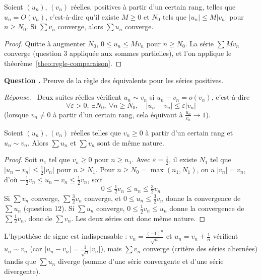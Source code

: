 \documentclass[11pt]{article}
\newcounter{qnum}
\newcommand{\question}[1]{%
\stepcounter{qnum}%
\bigskip
\noindent\textbf{Question \theqnum.} #1\par}
\newcommand{\reponse}{\noindent\textit{Réponse.}\ }
\begin{document}
\begin{coro}[Domination]
\label{coro:domination}
Soient $(u_n)$, $(v_n)$ réelles, positives à partir d'un certain rang, telles que $u_n=O(v_n)$, c'est-à-dire qu'il existe $M\geq 0$ et $N_0$ tels que $|u_n|\leq M|v_n|$ pour $n\geq N_0$. Si $\sum v_n$ converge, alors $\sum u_n$ converge.
\end{coro}

\begin{proof}
Quitte à augmenter $N_0$, $0\leq u_n\leq Mv_n$ pour $n\geq N_0$. La série $\sum Mv_n$ converge (question 3 appliquée aux sommes partielles), et l'on applique le théorème~\ref{theo:regle-comparaison}.
\end{proof}

\question{Preuve de la règle des équivalents pour les séries positives.}
\reponse
Deux suites réelles vérifient $u_n\sim v_n$ si $u_n-v_n=o(v_n)$, c'est-à-dire
\[\forall\varepsilon>0,\ \exists N_0,\ \forall n\geq N_0,\quad|u_n-v_n|\leq\varepsilon|v_n|\]
(lorsque $v_n\neq 0$ à partir d'un certain rang, cela équivaut à $\frac{u_n}{v_n}\to 1$).

\begin{theo}
\label{theo:regle-equivalents}
Soient $(u_n)$, $(v_n)$ réelles telles que $v_n\geq 0$ à partir d'un certain rang et $u_n\sim v_n$. Alors $\sum u_n$ et $\sum v_n$ sont de même nature.
\end{theo}

\begin{proof}
Soit $n_1$ tel que $v_n\geq 0$ pour $n\geq n_1$. Avec $\varepsilon=\frac12$, il existe $N_1$ tel que $|u_n-v_n|\leq\frac12|v_n|$ pour $n\geq N_1$. Pour $n\geq N_0=\max(n_1,N_1)$, on a $|v_n|=v_n$, d'où $-\frac12v_n\leq u_n-v_n\leq\frac12v_n$, soit
\[0\leq\tfrac12v_n\leq u_n\leq\tfrac32v_n\]
Si $\sum v_n$ converge, $\sum\frac32v_n$ converge, et $0\leq u_n\leq\frac32v_n$ donne la convergence de $\sum u_n$ (question 12). Si $\sum u_n$ converge, $0\leq\frac12v_n\leq u_n$ donne la convergence de $\sum\frac12v_n$, donc de $\sum v_n$. Les deux séries ont donc même nature.
\end{proof}

\begin{remarque}
L'hypothèse de signe est indispensable : $v_n=\frac{(-1)^n}{\sqrt n}$ et $u_n=v_n+\frac1n$ vérifient $u_n\sim v_n$ (car $|u_n-v_n|=\frac{1}{\sqrt n}|v_n|$), mais $\sum v_n$ converge (critère des séries alternées) tandis que $\sum u_n$ diverge (somme d'une série convergente et d'une série divergente).
\end{remarque}
\end{document}
